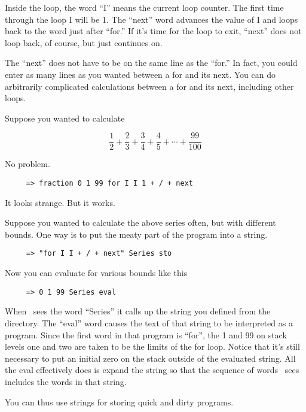\documentclass{report}
\begin{document}
Inside the loop, the word ``I'' means the current loop counter. The first time through the loop
I will be 1. The ``next'' word advances the value of I and loops back to the word just after
``for.'' If it's time for the loop to exit, ``next'' does not loop back, of course, but just
continues on.

The ``next'' does not have to be on the same line as the ``for.'' In fact, you could enter as
many lines as you wanted between a for and its next. You can do arbitrarily complicated
calculations between a for and its next, including other loops.

Suppose you wanted to calculate

\begin{displaymath}
     \frac{1}{2} + \frac{2}{3} + \frac{3}{4} + \frac{4}{5} + \cdots +
       \frac{99}{100}
\end{displaymath}

No problem.

\begin{verbatim}
     => fraction 0 1 99 for I I 1 + / + next
\end{verbatim}

It looks strange. But it works.

Suppose you wanted to calculate the above series often, but with different bounds. One way is to
put the meaty part of the program into a string.

\begin{verbatim}
     => "for I I + / + next" Series sto
\end{verbatim}

Now you can evaluate for various bounds like this

\begin{verbatim}
     => 0 1 99 Series eval
\end{verbatim}

When \CLAC\ sees the word ``Series'' it calls up the string you defined from the directory. The
``eval'' word causes the text of that string to be interpreted as a program. Since the first
word in that program is ``for'', the 1 and 99 on stack levels one and two are taken to be the
limits of the for loop. Notice that it's still necessary to put an initial zero on the stack
outside of the evaluated string. All the eval effectively does is expand the string so that the
sequence of words \CLAC\ sees includes the words in that string.

You can thus use strings for storing quick and dirty programs.
\end{document}
